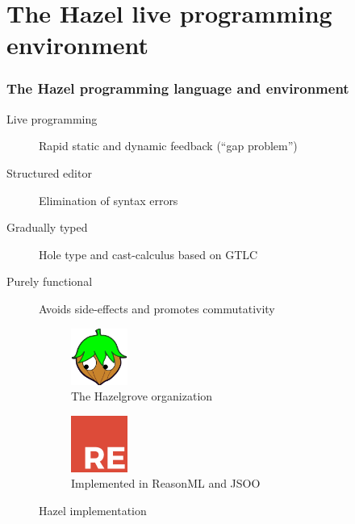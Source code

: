 \documentclass{beamer}
\begin{document}
\section{The Hazel live programming environment}

\begin{frame}
  \frametitle{The Hazel programming language and environment}

  \begin{description}
  \item[Live programming] Rapid static and dynamic feedback (``gap problem'')
  \item[Structured editor] Elimination of syntax errors
  \item[Gradually typed] Hole type and cast-calculus based on GTLC
  \item[Purely functional] Avoids side-effects and promotes commutativity
  \end{description}

  \begin{figure}
    \centering
    \begin{subfigure}[b]{0.5\textwidth}
      \centering
      \includegraphics[height=5em]{thesis/img/hazelgrove.png}
      \caption{The Hazelgrove organization}
    \end{subfigure}%
    \begin{subfigure}[b]{0.5\textwidth}
      \centering
      \includegraphics[height=5em]{thesis/img/reasonml.png}
      \caption{Implemented in ReasonML and JSOO}
    \end{subfigure}
    \caption{Hazel implementation}
  \end{figure}
\end{frame}
\end{document}
